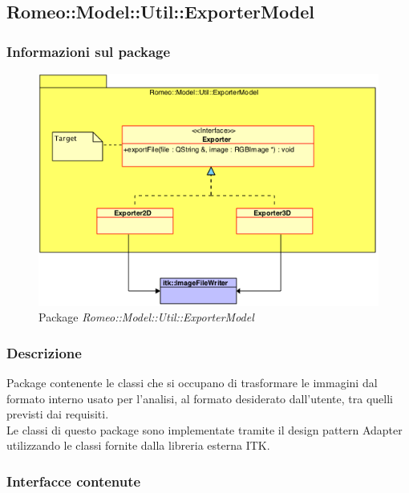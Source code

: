 \subsection{Romeo::Model::Util::ExporterModel}
	\label{romeo::model::util::exportermodel}
		\subsubsection{Informazioni sul package}
		\label{info_expmod}
		\begin{figure}[!h]
			\centering
			\includegraphics[width=\linewidth]{./Content/Immagini/ExporterModel.png}
			\caption{Package \textsl{Romeo::Model::Util::ExporterModel}}
			\label{comp_log}
		\end{figure}

		\subsubsection{Descrizione}
		\label{descr_expmod}
		Package\g{} contenente le classi che si occupano di trasformare le immagini dal formato interno usato per l'analisi, al formato desiderato dall'utente, tra quelli previsti dai requisiti.
		\\Le classi di questo package\g{} sono implementate tramite il design pattern\g{} Adapter utilizzando le classi fornite dalla libreria esterna ITK\g{}.

		\subsubsection{Interfacce contenute}
		\label{interface_exporter}
